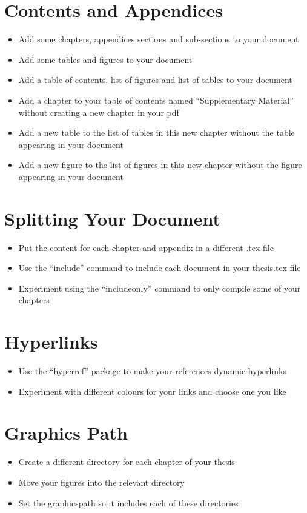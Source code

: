\documentclass[11pt,a4paper]{article}
\begin{document}
\section{Contents and Appendices}
\begin{itemize}
\item Add some chapters, appendices sections and sub-sections to your document
\item Add some tables and figures to your document
\item Add a table of contents, list of figures and list of tables to your document
\item Add a chapter to your table of contents named ``Supplementary Material'' without creating a new chapter in your pdf
\item Add a new table to the list of tables in this new chapter without the table appearing in your document
\item Add a new figure to the list of figures in this new chapter without the figure appearing in your document
\end{itemize}

\section{Splitting Your Document}
\begin{itemize}
\item Put the content for each chapter and appendix in a different .tex file
\item Use the ``include'' command to include each document in your thesis.tex file
\item Experiment using the ``includeonly'' command to only compile some of your chapters
\end{itemize}

\section{Hyperlinks}
\begin{itemize}
\item Use the ``hyperref'' package to make your references dynamic hyperlinks
\item Experiment with different colours for your links and choose one you like
\end{itemize}

\section{Graphics Path}
\begin{itemize}
\item Create a different directory for each chapter of your thesis
\item Move your figures into the relevant directory
\item Set the graphicspath so it includes each of these directories
\end{itemize}
\end{document}
